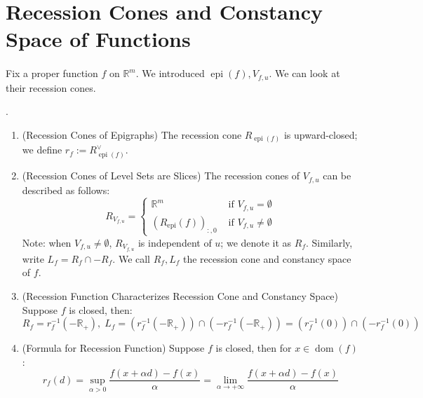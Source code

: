 \section{Recession Cones and Constancy Space of Functions}
\label{sect:024}

\paragraph{}Fix a proper function $f$ on $\mathbb{R}^m$. We introduced $\operatorname{epi}(f),V_{f,u}$. We can look at their recession cones.

\begin{prop}\label{prop:024-recess-epi-level}
	.
	\begin{enumerate}[label=(\alph*)]
		\item (Recession Cones of Epigraphs) The recession cone $R_{\operatorname{epi}(f)}$ is upward-closed; we define $r_f:=R_{\operatorname{epi}(f)}^\vee$.
		\item (Recession Cones of Level Sets are Slices) The recession cones of $V_{f,u}$ can be described as follows:
		      \[
			      R_{V_{f,u}}=\begin{cases}
				      \mathbb{R}^m                                 & \text{ if }V_{f,u}=\emptyset    \\
				      \left(R_{\operatorname{epi}}(f)\right)_{:,0} & \text{ if }V_{f,u}\neq\emptyset
			      \end{cases}
		      \]
		      Note: when $V_{f,u}\neq\emptyset$, $R_{V_{f,u}}$ is independent of $u$; we denote it as $R_f$. Similarly, write $L_{f}=R_f\cap -R_f$. We call $R_f,L_f$ the recession cone and constancy space of $f$.
		\item (Recession Function Characterizes Recession Cone and Constancy Space) Suppose $f$ is closed, then:
		      \[
			      R_f=r_f^{-1}\left(-\mathbb{R}_{+}\right),\;
			      L_f=\left(r_f^{-1}\left(-\mathbb{R}_{+}\right)\right)\cap\left(-r_f^{-1}(-\mathbb{R}_{+})\right)=\left(r_f^{-1}(0)\right)\cap\left(-r_f^{-1}(0)\right)
		      \]
		\item (Formula for Recession Function) Suppose $f$ is closed, then for $x\in \operatorname{dom}(f)$:
		      \[
			      r_f(d)=\underset{\alpha >0}{\operatorname{sup}}\frac{f(x+\alpha d)-f(x)}{\alpha }
			      =\lim_{\alpha \to+\infty}\frac{f(x+\alpha d)-f(x)}{\alpha }
		      \]
	\end{enumerate}
\end{prop}

